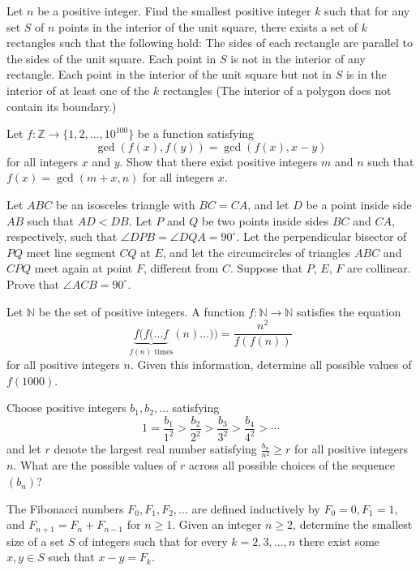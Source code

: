 \documentclass[11pt]{scrartcl}
\begin{document}
\begin{problem}[792975361721939]
	Let $n$ be a positive integer. Find the smallest positive integer $k$ such that for any set $S$ of $n$ points in the interior of the unit square, there exists a set of $k$ rectangles such that the following hold:
The sides of each rectangle are parallel to the sides of the unit square.
Each point in $S$ is not in the interior of any rectangle.
Each point in the interior of the unit square but not in $S$ is in the interior of at least one of the $k$ rectangles
(The interior of a polygon does not contain its boundary.)
\end{problem}
\begin{problem}[461803484803557]
	Let $f: \mathbb Z\to \{1, 2, \dots, 10^{100}\}$ be a function satisfying
$$\gcd(f(x), f(y)) = \gcd(f(x), x-y)$$for all integers $x$ and $y$. Show that there exist positive integers $m$ and $n$ such that $f(x) = \gcd(m+x, n)$ for all integers $x$.
\end{problem}
\begin{problem}[6302540840099076878]
Let $ABC$ be an isosceles triangle with $BC=CA$, and let $D$ be a point inside side $AB$ such that $AD< DB$. Let $P$ and $Q$ be two points inside sides $BC$ and $CA$, respectively, such that $\angle DPB = \angle DQA = 90^{\circ}$. Let the perpendicular bisector of $PQ$ meet line segment $CQ$ at $E$, and let the circumcircles of triangles $ABC$ and $CPQ$ meet again at point $F$, different from $C$.
Suppose that $P$, $E$, $F$ are collinear. Prove that $\angle ACB = 90^{\circ}$.
\end{problem}
\begin{problem}[18644549011438]
Let $\mathbb{N}$ be the set of positive integers. A function $f:\mathbb{N}\to\mathbb{N}$ satisfies the equation\[\underbrace{f(f(\ldots f}_{f(n)\text{ times}}(n)\ldots))=\frac{n^2}{f(f(n))}\]for all positive integers $n$. Given this information, determine all possible values of $f(1000)$.
\end{problem}
\begin{problem}[6666334949338369993]
	Choose positive integers $b_1, b_2, \dotsc$ satisfying
\[1=\frac{b_1}{1^2} > \frac{b_2}{2^2} > \frac{b_3}{3^2} > \frac{b_4}{4^2} > \dotsb\]and let $r$ denote the largest real number satisfying $\tfrac{b_n}{n^2} \geq r$ for all positive integers $n$. What are the possible values of $r$ across all possible choices of the sequence $(b_n)$?
\end{problem}
\begin{problem}[6978535805224432571]
	The Fibonacci numbers $F_0, F_1, F_2, . . .$ are defined inductively by $F_0=0, F_1=1$, and $F_{n+1}=F_n+F_{n-1}$ for $n \ge 1$. Given an integer $n \ge 2$, determine the smallest size of a set $S$ of integers such that for every $k=2, 3, . . . , n$ there exist some $x, y \in S$ such that $x-y=F_k$.
\end{problem}
\end{document}
